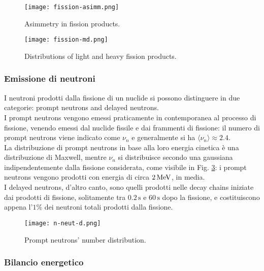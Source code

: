 \begin{figure}
	\centering
	\texttt{[image: fission-asimm.png]}
	\caption{Asimmetry in fission products.}
	\label{fission-asimm}
\end{figure}
\begin{figure}
	\centering
	\texttt{[image: fission-md.png]}
	\caption{Distributions of light and heavy fission products.}
	\label{fission-md}
\end{figure}

\subsubsection{Emissione di neutroni}

I neutroni prodotti dalla fissione di un nuclide si possono distinguere in due categorie: prompt neutrons and delayed neutrons.\\
I prompt neutrons vengono emessi praticamente in contemporanea al processo di fissione, venendo emessi dal nuclide fissile e dai frammenti di fissione: il numero di prompt neutrons viene indicato come $ \nu_n $ e generalmente si ha $ \langle \nu_n \rangle \approx 2.4 $.\\
La distribuzione di prompt neutrons in base alla loro energia cinetica è una distribuzione di Maxwell, mentre $ \nu_n $ si distribuisce secondo una gaussiana indipendentemente dalla fissione considerata, come visibile in Fig. \ref{n-neut-dist}: i prompt neutrons vengono prodotti con energia di circa $ 2\,\mathrm{MeV} $, in media.\\
I delayed neutrons, d'altro canto, sono quelli prodotti nelle decay chains iniziate dai prodotti di fissione, solitamente tra $ 0.2\,\text{s} $ e $ 60\,\text{s} $ dopo la fissione, e costituiscono appena l'$ 1\% $ dei neutroni totali prodotti dalla fissione.

\begin{figure}[!b]
	\centering
	\texttt{[image: n-neut-d.png]}
	\caption{Prompt neutrons' number distribution.}
	\label{n-neut-dist}
\end{figure}

\subsubsection{Bilancio energetico}

